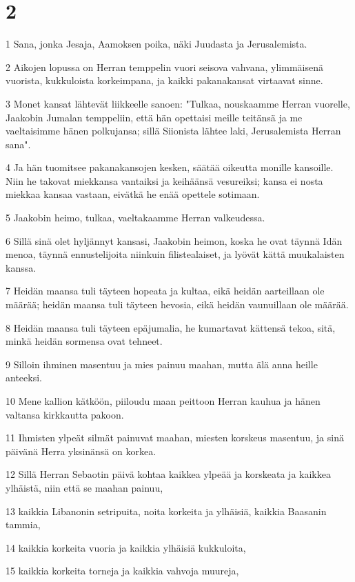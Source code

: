 \chapter{2}

\par 1 Sana, jonka Jesaja, Aamoksen poika, näki Juudasta ja Jerusalemista.
\par 2 Aikojen lopussa on Herran temppelin vuori seisova vahvana, ylimmäisenä vuorista, kukkuloista korkeimpana, ja kaikki pakanakansat virtaavat sinne.
\par 3 Monet kansat lähtevät liikkeelle sanoen: "Tulkaa, nouskaamme Herran vuorelle, Jaakobin Jumalan temppeliin, että hän opettaisi meille teitänsä ja me vaeltaisimme hänen polkujansa; sillä Siionista lähtee laki, Jerusalemista Herran sana".
\par 4 Ja hän tuomitsee pakanakansojen kesken, säätää oikeutta monille kansoille. Niin he takovat miekkansa vantaiksi ja keihäänsä vesureiksi; kansa ei nosta miekkaa kansaa vastaan, eivätkä he enää opettele sotimaan.
\par 5 Jaakobin heimo, tulkaa, vaeltakaamme Herran valkeudessa.
\par 6 Sillä sinä olet hyljännyt kansasi, Jaakobin heimon, koska he ovat täynnä Idän menoa, täynnä ennustelijoita niinkuin filistealaiset, ja lyövät kättä muukalaisten kanssa.
\par 7 Heidän maansa tuli täyteen hopeata ja kultaa, eikä heidän aarteillaan ole määrää; heidän maansa tuli täyteen hevosia, eikä heidän vaunuillaan ole määrää.
\par 8 Heidän maansa tuli täyteen epäjumalia, he kumartavat kättensä tekoa, sitä, minkä heidän sormensa ovat tehneet.
\par 9 Silloin ihminen masentuu ja mies painuu maahan, mutta älä anna heille anteeksi.
\par 10 Mene kallion kätköön, piiloudu maan peittoon Herran kauhua ja hänen valtansa kirkkautta pakoon.
\par 11 Ihmisten ylpeät silmät painuvat maahan, miesten korskeus masentuu, ja sinä päivänä Herra yksinänsä on korkea.
\par 12 Sillä Herran Sebaotin päivä kohtaa kaikkea ylpeää ja korskeata ja kaikkea ylhäistä, niin että se maahan painuu,
\par 13 kaikkia Libanonin setripuita, noita korkeita ja ylhäisiä, kaikkia Baasanin tammia,
\par 14 kaikkia korkeita vuoria ja kaikkia ylhäisiä kukkuloita,
\par 15 kaikkia korkeita torneja ja kaikkia vahvoja muureja,
